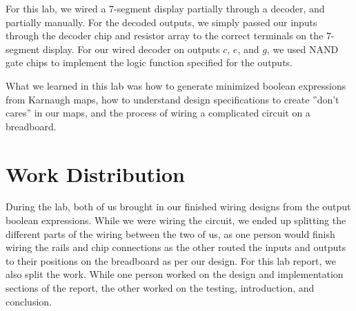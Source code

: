 \documentclass{article}
\begin{document}
For this lab, we wired a 7-segment display partially through a
decoder, and partially manually. For the decoded outputs, we simply
passed our inputs through the decoder chip and resistor array to the
correct terminals on the 7-segment display. For our wired decoder on
outputs $c$, $e$, and $g$, we used NAND gate chips to implement the
logic function specified for the outputs.

What we learned in this lab was how to generate minimized boolean
expressions from Karnaugh maps, how to understand design
specifications to create ''don't cares'' in our maps, and the process
of wiring a complicated circuit on a breadboard.


\section{Work Distribution}

During the lab, both of us brought in our finished wiring designs from
the output boolean expressions. While we were wiring the circuit, we
ended up splitting the different parts of the wiring between the two
of us, as one person would finish wiring the rails and chip
connections as the other routed the inputs and outputs to their
positions on the breadboard as per our design. For this lab report, we
also split the work. While one person worked on the design and
implementation sections of the report, the other worked on the
testing, introduction, and conclusion.
\end{document}
